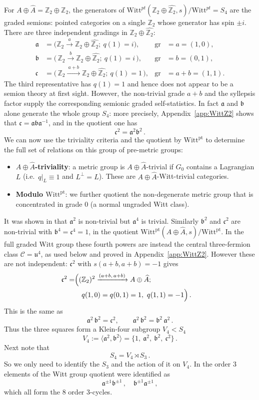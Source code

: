 \documentclass[aps,twocolumn,prx,floatfix,preprintnumbers, nofootinbib,10pt]{revtex4-2}
\numberwithin{equation}{section}
\theoremstyle{definition}
\theoremstyle{remark}
\theoremstyle{claim}
\newcommand{\Perm}{S}
\newcommand{\be}{\begin{equation}}
\newcommand{\ee}{\end{equation}}
\newcommand{\ba}{\begin{aligned}}
\newcommand{\ea}{\end{aligned}}
\newcommand{\gr}{\operatorname{gr}}
\newcommand{\ga}{\mathfrak{a}}
\newcommand{\gb}{\mathfrak{b}}
\newcommand{\gc}{\mathfrak{c}}
\newcommand{\gu}{\mathfrak{u}}
\newcommand{\Z}{{\mathbb Z}}
\newcommand{\cC}{\mathcal{C}}
\newcommand{\Witt}{\text{Witt}}
\newcommand{\pt}{\text{pt}}
\begin{document}
For $A \oplus \widehat{A}= \Z_2 \oplus \Z_2$, the generators of $\Witt^{pt}(\Z_2 \oplus \widehat{\Z_2},s)/\Witt^{pt}= \Perm_4$ are the graded semions: pointed categories on a
single $\Z_2$ whose generator has spin $\pm i$. 
There are three independent gradings in $\Z_2 \oplus \widehat{\Z_2}$:
\begin{align}\label{eq:gens}
 \ga &= \bigl(\Z_2 \xrightarrow{\ a\ } \Z_2 \oplus \widehat{\Z_2};\ q(1)=i\bigr),  & \gr&=a=(1,0), \nonumber \\
 \gb &= \bigl(\,\Z_2 \xrightarrow{\ b\ } \Z_2 \oplus \widehat{\Z_2};\ q(1)=i\,\bigr), &\gr&=b=(0,1), \nonumber \\
 \gc &= \bigl(\,\Z_2 \xrightarrow{\ a+b\ } \Z_2 \oplus \widehat{\Z_2};\ q(1)=1\,\bigr),  &\gr&=a+b=(1,1).
\end{align}
The third representative has $q(1)=1$ and hence does not appear to be a semion theory at first sight.  However, the non-trivial grade $a+b$ and the
syllepsis factor supply the corresponding semionic graded self-statistics.
In fact  $\ga$ and $\gb$ alone generate the whole group $\Perm_4$:
more precisely, Appendix~\ref{app:WittZ2} shows that
$\gc=\ga\gb\ga^{-1}$, and in the quotient one has
\be 
\gc^2=\ga^2\gb^2\,.
\ee 
We can now use the triviality criteria and the quotient by $\Witt^{\pt}$ to determine the full set of relations on this {group of pre-metric groups}:
\begin{itemize}
\item \textbf{{$A \oplus \widehat{A}$}-triviality}: a metric group is {$A \oplus \widehat{A}$}-trivial if $G_0$         contains a Lagrangian
      $L$ (i.e.\ $q|_L\equiv1$ and $L^\perp=L$). These are {$A \oplus \widehat{A}$}-Witt-trivial categories.
\item \textbf{Modulo $\Witt^\pt$}: we further quotient the non-degenerate metric group that is
      concentrated in grade $0$ (a normal ungraded Witt class).
\end{itemize}

\noindent{\bf Powers of $\ga, \gb, \gc$.}
It was shown in \cite{Bhardwaj:2024xcx} that $\ga^2$ is non-trivial but $\ga^4$ is trivial. Similarly $\gb^2$ and $\gc^2$ are non-trivial with $\gb^4= \gc^4=1$, in the quotient
$\Witt^\pt({A \oplus \widehat{A}},s)/\Witt^\pt$. In the full graded
Witt group these fourth powers are instead the central three-fermion class
$\cC=\gu^4$, as used below and proved in Appendix~\ref{app:WittZ2}.
However these are not independent: 
$\gc^2$ with $s(a+b,a+b)=-1$ gives
\be\ba
  \gc^2=&\Bigl((\Z_2)^2\xrightarrow{(a+b,\,a+b)}{A \oplus \widehat{A}};\cr 
  &\quad         q(1,0)=q(0,1)=1,\ q(1,1)=-1\Bigr)\,.\ea
\ee
This is the same as 
\be\label{V4-mult}
 \ga^2\,\gb^2=\gc^2,\qquad \ga^2\,\gb^2=\gb^2\,\ga^2\,.
\ee
Thus the three squares form a Klein-four subgroup $V_4< \Perm_4$ 
\be\label{V4}
  V_4:=\langle \ga^2,\gb^2\rangle=\{1,\ \ga^2,\ \gb^2,\ \gc^2\} \,.
\ee
Next note that 
\be
\Perm_4 = V_4 \rtimes \Perm_3 \,.
\ee
So we only need to identify the $\Perm_3$ and the action of it on $V_4$. 
In \cite{Bhardwaj:2024xcx} the order 3 elements of the Witt group quotient were identified as 
\be
\ga^{\pm 1} \gb^{\pm 1} \,,\quad \gb^{\pm 1} \ga^{\pm 1} \,,
\ee
which all form the 8 order $3$-cycles. 
\end{document}
